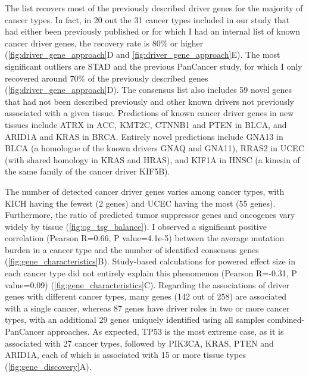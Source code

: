 The list recovers most of the previously described driver genes for the majority of cancer types. In fact, in 20 out the 31 cancer types included in our study that had either been previously published or for which I had an internal list of known cancer driver genes, the recovery rate is 80\% or higher (\autoref{fig:driver_gene_approach}D and \autoref{fig:driver_gene_approach}E). The most significant outliers are STAD and the previous PanCancer study, for which I only recovered around 70\% of the previously described genes (\autoref{fig:driver_gene_approach}D). The consensus list also includes 59 novel genes that had not been described previously and other known drivers not previously associated with a given tissue. Predictions of known cancer driver genes in new tissues include ATRX in ACC, KMT2C, CTNNB1 and PTEN in BLCA, and ARID1A and KRAS in BRCA. Entirely novel predictions include GNA13 in BLCA (a homologue of the known drivers GNAQ and GNA11), RRAS2 in UCEC (with shared homology in KRAS and HRAS), and KIF1A in HNSC (a kinesin of the same family of the cancer driver KIF5B). 

The number of detected cancer driver genes varies among cancer types, with KICH having the fewest (2 genes) and UCEC having the most (55 genes). Furthermore, the ratio of predicted tumor suppressor genes and oncogenes vary widely by tissue (\autoref{fig:og_tsg_balance}). I observed a significant positive correlation (Pearson R=0.66, P value=4.1e-5) between the average mutation burden in a cancer type and the number of identified consensus genes (\autoref{fig:gene_characteristics}B). Study-based calculations for powered effect size in each cancer type did not entirely explain this phenomenon (Pearson R=-0.31, P value=0.09) (\autoref{fig:gene_characteristics}C). Regarding the associations of driver genes with different cancer types, many genes (142 out of 258) are associated with a single cancer, whereas 87 genes have driver roles in two or more cancer types, with an additional 29 genes uniquely identified using all samples combined-PanCancer approaches. As expected, TP53 is the most extreme case, as it is associated with 27 cancer types, followed by PIK3CA, KRAS, PTEN and ARID1A, each of which is associated with 15 or more tissue types (\autoref{fig:gene_discovery}A).

